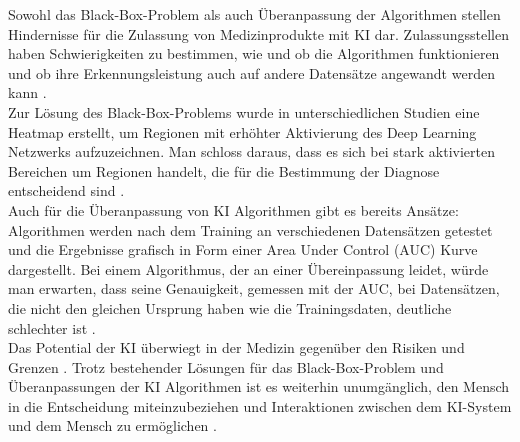 Sowohl das Black-Box-Problem als auch Überanpassung der Algorithmen stellen Hindernisse für die Zulassung von Medizinprodukte mit KI dar. Zulassungsstellen haben Schwierigkeiten zu bestimmen, wie und ob die Algorithmen funktionieren und ob ihre Erkennungsleistung auch auf andere Datensätze angewandt werden kann \cite{AI_where_are_we_now}.\\
Zur Lösung des Black-Box-Problems wurde in unterschiedlichen Studien eine Heatmap erstellt, um Regionen mit erhöhter Aktivierung des Deep Learning Netzwerks aufzuzeichnen. Man schloss daraus, dass es sich bei stark aktivierten Bereichen um Regionen handelt, die für die Bestimmung der Diagnose entscheidend sind \cite{AI_where_are_we_now}.\\
Auch für die Überanpassung von KI Algorithmen gibt es bereits Ansätze: Algorithmen werden nach dem Training an verschiedenen Datensätzen getestet\cite{AI_where_are_we_now} und die Ergebnisse grafisch in Form einer Area Under Control (AUC)  Kurve dargestellt. Bei einem Algorithmus, der an einer Übereinpassung leidet, würde man erwarten, dass seine Genauigkeit, gemessen mit der AUC, bei Datensätzen, die nicht den gleichen Ursprung haben wie die Trainingsdaten, deutliche schlechter ist \cite{AI_where_are_we_now}.\\
Das Potential der KI überwiegt in der Medizin  gegenüber den Risiken und Grenzen  \cite{Chapter_14}. Trotz bestehender Lösungen für das Black-Box-Problem und Überanpassungen der KI Algorithmen ist es weiterhin unumgänglich, den Mensch in die Entscheidung miteinzubeziehen und Interaktionen zwischen dem KI-System und dem Mensch zu ermöglichen
\cite{AI_where_are_we_now}.
